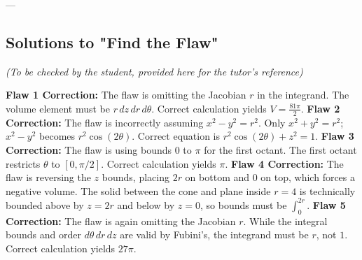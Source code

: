 \documentclass[11pt]{article}
\begin{document}
---
\subsection*{Solutions to "Find the Flaw"}
\textit{(To be checked by the student, provided here for the tutor's reference)}

\textbf{Flaw 1 Correction:} The flaw is omitting the Jacobian $r$ in the integrand. The volume element must be $r \, dz \, dr \, d\theta$. Correct calculation yields $V = \frac{81\pi}{2}$.
\textbf{Flaw 2 Correction:} The flaw is incorrectly assuming $x^2 - y^2 = r^2$. Only $x^2 + y^2 = r^2$; $x^2 - y^2$ becomes $r^2\cos(2\theta)$. Correct equation is $r^2\cos(2\theta) + z^2 = 1$.
\textbf{Flaw 3 Correction:} The flaw is using bounds $0$ to $\pi$ for the first octant. The first octant restricts $\theta$ to $[0, \pi/2]$. Correct calculation yields $\pi$.
\textbf{Flaw 4 Correction:} The flaw is reversing the $z$ bounds, placing $2r$ on bottom and $0$ on top, which forces a negative volume. The solid between the cone and plane inside $r=4$ is technically bounded above by $z=2r$ and below by $z=0$, so bounds must be $\int_0^{2r}$. 
\textbf{Flaw 5 Correction:} The flaw is again omitting the Jacobian $r$. While the integral bounds and order $d\theta \, dr \, dz$ are valid by Fubini's, the integrand must be $r$, not $1$. Correct calculation yields $27\pi$.
\end{document}
